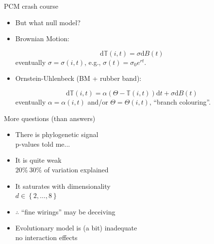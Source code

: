 \documentclass[]{beamer}
\begin{document}
\begin{frame}{PCM crash course}

\centering

\begin{itemize}[<+->]
\itemsep1pt\parskip0pt
\item
But what null model?
\item
Brownian Motion:

\begin{equation*}
\mathrm{d} \mathbb{T}(i,t) = \sigma \mathrm{d}B(t)
\end{equation*}
eventually $\sigma = \sigma(i,t)$, e.g., $\sigma(t) = \sigma_0 e^{rt}$.

\item
Ornstein-Uhlenbeck (BM + rubber band):

\begin{equation*}
\mathrm{d} \mathbb{T}(i,t) = \alpha \left( \Theta -  \mathbb{T}(i,t) \right)\mathrm{d}t  + \sigma \mathrm{d}B(t)
\end{equation*}
eventually $\alpha = \alpha(i,t)$ and/or $\Theta = \Theta(i,t)$, ``branch colouring''.

\end{itemize}

\end{frame}

\begin{frame}{More questions (than answers)}

\begin{itemize}[<+->]
\itemsep1pt\parskip0pt
\item
  There is phylogenetic signal\\
  {\tiny p-values told me...}
\item
  It is quite weak\\
  {\tiny $20\% ~ 30\%$ of variation explained}
\item
  It saturates with dimensionality\\
  {\tiny $d \in \left\{2, \dots , 8 \right\}$}
\item
  $\therefore$ ``fine wirings'' may be deceiving
\item
  Evolutionary model is (a bit) inadequate\\
  {\tiny no interaction effects}
\end{itemize}

\end{frame}
\end{document}
